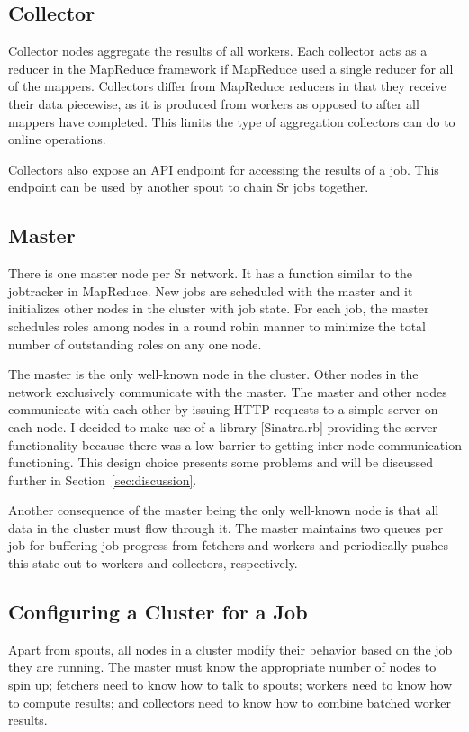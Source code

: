 \documentclass[12pt]{article}
\begin{document}
\subsection{Collector}
Collector nodes aggregate the results of all workers. Each collector acts as a reducer
in the MapReduce framework if MapReduce used a single reducer for all of the mappers.
Collectors differ from MapReduce reducers in that they receive their data piecewise, as it
is produced from workers as opposed to after all mappers have completed. This limits the
type of aggregation collectors can do to online operations.

Collectors also expose an API endpoint for accessing the results of a job. This endpoint
can be used by another spout to chain Sr jobs together.
\subsection{Master}
There is one master node per Sr network. It has a function similar to the jobtracker in
MapReduce. New jobs are scheduled with the master and it initializes other nodes in the
cluster with job state. For each job, the master schedules roles among nodes in a round robin
manner to minimize the total number of outstanding roles on any one node.

The master is the only well-known node in the cluster. Other nodes in the network exclusively
communicate with the master. The master and other nodes communicate with each other by issuing
HTTP requests to a simple server on each node. I decided to make use of a library [Sinatra.rb]
providing the server functionality because there was a low barrier to getting inter-node
communication functioning. This design choice presents some problems and will be discussed
further in Section~\ref{sec:discussion}.

Another consequence of the master being the only well-known node is that all data in the
cluster must flow through it. The master maintains two queues per job for buffering job
progress from fetchers and workers and periodically pushes this state out to workers and
collectors, respectively.
\subsection{Configuring a Cluster for a Job}
Apart from spouts, all nodes in a cluster modify their behavior based on the job they are
running. The master must know the appropriate number of nodes to spin up; fetchers need to
know how to talk to spouts; workers need to know how to compute results; and collectors need
to know how to combine batched worker results.
\end{document}
